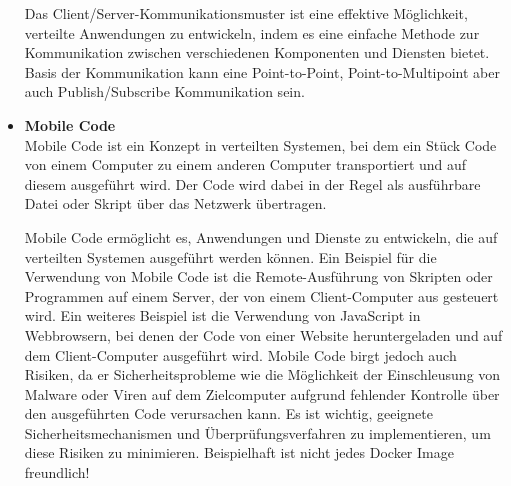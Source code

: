 \documentclass[../vs-script-first-v01.tex]{subfiles}
\begin{document}
\begin{itemize}
Das Client/Server-Kommunikationsmuster ist eine effektive Möglichkeit, verteilte Anwendungen zu entwickeln, indem es eine einfache Methode zur Kommunikation zwischen verschiedenen Komponenten und Diensten bietet. Basis der Kommunikation kann eine Point-to-Point, Point-to-Multipoint aber auch Publish/Subscribe Kommunikation sein. 

\item \textbf{Mobile Code}\\
Mobile Code ist ein Konzept in verteilten Systemen, bei dem ein Stück Code von einem Computer zu einem anderen Computer transportiert und auf diesem ausgeführt wird. Der Code wird dabei in der Regel als ausführbare Datei oder Skript über das Netzwerk übertragen.

Mobile Code ermöglicht es, Anwendungen und Dienste zu entwickeln, die auf verteilten Systemen ausgeführt werden können. Ein Beispiel für die Verwendung von Mobile Code ist die Remote-Ausführung von Skripten oder Programmen auf einem Server, der von einem Client-Computer aus gesteuert wird. Ein weiteres Beispiel ist die Verwendung von JavaScript in Webbrowsern, bei denen der Code von einer Website heruntergeladen und auf dem Client-Computer ausgeführt wird.
Mobile Code birgt jedoch auch Risiken, da er Sicherheitsprobleme wie die Möglichkeit der Einschleusung von Malware oder Viren auf dem Zielcomputer aufgrund fehlender Kontrolle über den ausgeführten Code verursachen kann. Es ist wichtig, geeignete Sicherheitsmechanismen und Überprüfungsverfahren zu implementieren, um diese Risiken zu minimieren. Beispielhaft ist nicht jedes Docker Image freundlich!


\end{itemize}
\end{document}

